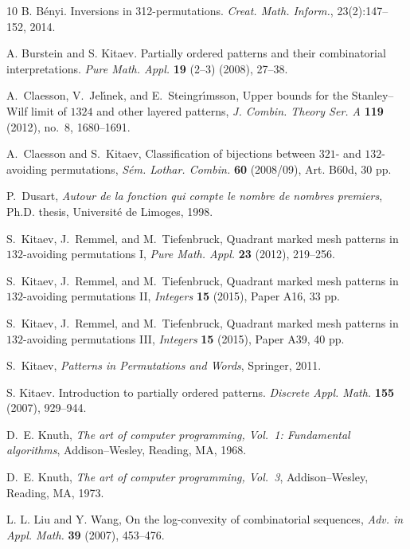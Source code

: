 \documentclass[11pt]{article}
\begin{document}
\begin{thebibliography}{10}
B. B\'enyi.
Inversions in 312-permutations.
\textit{Creat. Math. Inform.},
23(2):147--152, 2014.

A. Burstein and S. Kitaev. 
Partially ordered patterns and their combinatorial interpretations. 
{\em Pure Math. Appl.} 
{\bf 19} (2--3) (2008), 27--38.

A.~Claesson, V.~Jel\'{\i}nek, and E.~Steingr\'{\i}msson,
Upper bounds for the Stanley--Wilf limit of $1324$ and other layered
patterns,
{\em J. Combin. Theory Ser. A}
{\bf 119} (2012), no.~8, 1680--1691.


A.~Claesson and S.~Kitaev,
Classification of bijections between $321$- and $132$-avoiding permutations,
\emph{S\'em. Lothar. Combin.} \textbf{60} (2008/09), Art. B60d, 30 pp.

P.~Dusart,
\emph{Autour de la fonction qui compte le nombre de nombres premiers},
Ph.D. thesis, Universit\'e de Limoges, 1998.

S.~Kitaev, J.~Remmel, and M.~Tiefenbruck,
Quadrant marked mesh patterns in $132$-avoiding permutations I,
\emph{Pure Math. Appl.} \textbf{23} (2012), 219--256.

S.~Kitaev, J.~Remmel, and M.~Tiefenbruck,
Quadrant marked mesh patterns in $132$-avoiding permutations II,
\emph{Integers} \textbf{15} (2015), Paper A16, 33 pp.

S.~Kitaev, J.~Remmel, and M.~Tiefenbruck,
Quadrant marked mesh patterns in $132$-avoiding permutations III,
\emph{Integers} \textbf{15} (2015), Paper A39, 40 pp.

S.~Kitaev,
\emph{Patterns in Permutations and Words},
Springer, 2011.

S. Kitaev. 
Introduction to partially ordered patterns. 
{\em Discrete Appl. Math.} 
{\bf 155} (2007), 929--944.

D.~E. Knuth,
{\em The art of computer programming, Vol.~1:
Fundamental algorithms},
Addison--Wesley, Reading, MA, 1968.

D.~E. Knuth,
{\em The art of computer programming, Vol.~3},
Addison--Wesley, Reading, MA, 1973.

L. L. Liu and Y. Wang, On the log-convexity of combinatorial sequences,
\textit{Adv. in Appl. Math.} \textbf{39} (2007), 453--476.


\end{thebibliography}
\end{document}
